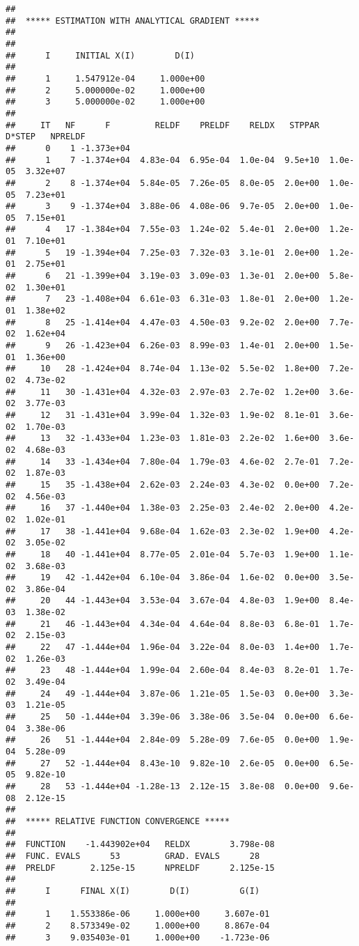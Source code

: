 \documentclass[]{article}
\begin{document}
\begin{verbatim}
## 
##  ***** ESTIMATION WITH ANALYTICAL GRADIENT ***** 
## 
## 
##      I     INITIAL X(I)        D(I)
## 
##      1     1.547912e-04     1.000e+00
##      2     5.000000e-02     1.000e+00
##      3     5.000000e-02     1.000e+00
## 
##     IT   NF      F         RELDF    PRELDF    RELDX   STPPAR   D*STEP   NPRELDF
##      0    1 -1.373e+04
##      1    7 -1.374e+04  4.83e-04  6.95e-04  1.0e-04  9.5e+10  1.0e-05  3.32e+07
##      2    8 -1.374e+04  5.84e-05  7.26e-05  8.0e-05  2.0e+00  1.0e-05  7.23e+01
##      3    9 -1.374e+04  3.88e-06  4.08e-06  9.7e-05  2.0e+00  1.0e-05  7.15e+01
##      4   17 -1.384e+04  7.55e-03  1.24e-02  5.4e-01  2.0e+00  1.2e-01  7.10e+01
##      5   19 -1.394e+04  7.25e-03  7.32e-03  3.1e-01  2.0e+00  1.2e-01  2.75e+01
##      6   21 -1.399e+04  3.19e-03  3.09e-03  1.3e-01  2.0e+00  5.8e-02  1.30e+01
##      7   23 -1.408e+04  6.61e-03  6.31e-03  1.8e-01  2.0e+00  1.2e-01  1.38e+02
##      8   25 -1.414e+04  4.47e-03  4.50e-03  9.2e-02  2.0e+00  7.7e-02  1.62e+04
##      9   26 -1.423e+04  6.26e-03  8.99e-03  1.4e-01  2.0e+00  1.5e-01  1.36e+00
##     10   28 -1.424e+04  8.74e-04  1.13e-02  5.5e-02  1.8e+00  7.2e-02  4.73e-02
##     11   30 -1.431e+04  4.32e-03  2.97e-03  2.7e-02  1.2e+00  3.6e-02  3.77e-03
##     12   31 -1.431e+04  3.99e-04  1.32e-03  1.9e-02  8.1e-01  3.6e-02  1.70e-03
##     13   32 -1.433e+04  1.23e-03  1.81e-03  2.2e-02  1.6e+00  3.6e-02  4.68e-03
##     14   33 -1.434e+04  7.80e-04  1.79e-03  4.6e-02  2.7e-01  7.2e-02  1.87e-03
##     15   35 -1.438e+04  2.62e-03  2.24e-03  4.3e-02  0.0e+00  7.2e-02  4.56e-03
##     16   37 -1.440e+04  1.38e-03  2.25e-03  2.4e-02  2.0e+00  4.2e-02  1.02e-01
##     17   38 -1.441e+04  9.68e-04  1.62e-03  2.3e-02  1.9e+00  4.2e-02  3.05e-02
##     18   40 -1.441e+04  8.77e-05  2.01e-04  5.7e-03  1.9e+00  1.1e-02  3.68e-03
##     19   42 -1.442e+04  6.10e-04  3.86e-04  1.6e-02  0.0e+00  3.5e-02  3.86e-04
##     20   44 -1.443e+04  3.53e-04  3.67e-04  4.8e-03  1.9e+00  8.4e-03  1.38e-02
##     21   46 -1.443e+04  4.34e-04  4.64e-04  8.8e-03  6.8e-01  1.7e-02  2.15e-03
##     22   47 -1.444e+04  1.96e-04  3.22e-04  8.0e-03  1.4e+00  1.7e-02  1.26e-03
##     23   48 -1.444e+04  1.99e-04  2.60e-04  8.4e-03  8.2e-01  1.7e-02  3.49e-04
##     24   49 -1.444e+04  3.87e-06  1.21e-05  1.5e-03  0.0e+00  3.3e-03  1.21e-05
##     25   50 -1.444e+04  3.39e-06  3.38e-06  3.5e-04  0.0e+00  6.6e-04  3.38e-06
##     26   51 -1.444e+04  2.84e-09  5.28e-09  7.6e-05  0.0e+00  1.9e-04  5.28e-09
##     27   52 -1.444e+04  8.43e-10  9.82e-10  2.6e-05  0.0e+00  6.5e-05  9.82e-10
##     28   53 -1.444e+04 -1.28e-13  2.12e-15  3.8e-08  0.0e+00  9.6e-08  2.12e-15
## 
##  ***** RELATIVE FUNCTION CONVERGENCE *****
## 
##  FUNCTION    -1.443902e+04   RELDX        3.798e-08
##  FUNC. EVALS      53         GRAD. EVALS      28
##  PRELDF       2.125e-15      NPRELDF      2.125e-15
## 
##      I      FINAL X(I)        D(I)          G(I)
## 
##      1    1.553386e-06     1.000e+00     3.607e-01
##      2    8.573349e-02     1.000e+00     8.867e-04
##      3    9.035403e-01     1.000e+00    -1.723e-06
\end{verbatim}
\end{document}
